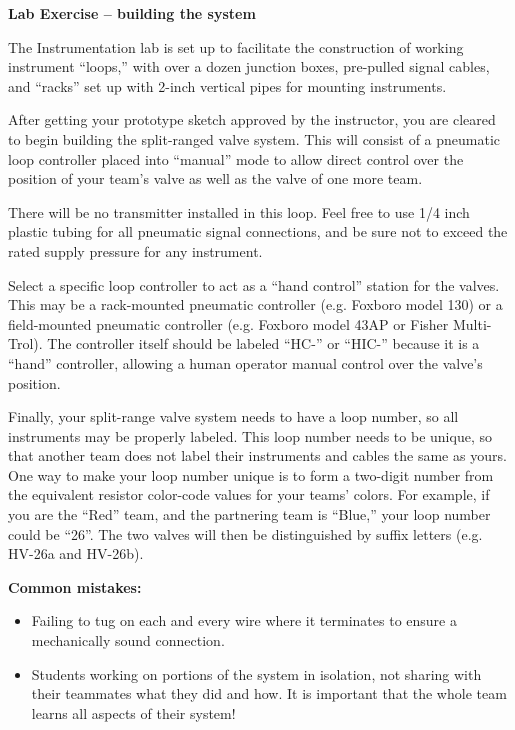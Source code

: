\vfil \eject

\noindent
{\bf Lab Exercise -- building the system}

\vskip 5pt

The Instrumentation lab is set up to facilitate the construction of working instrument ``loops,'' with over a dozen junction boxes, pre-pulled signal cables, and ``racks'' set up with 2-inch vertical pipes for mounting instruments.  

After getting your prototype sketch approved by the instructor, you are cleared to begin building the split-ranged valve system.  This will consist of a pneumatic loop controller placed into ``manual'' mode to allow direct control over the position of your team's valve as well as the valve of one more team.  

There will be no transmitter installed in this loop.  Feel free to use 1/4 inch plastic tubing for all pneumatic signal connections, and be sure not to exceed the rated supply pressure for any instrument.

Select a specific loop controller to act as a ``hand control'' station for the valves.  This may be a rack-mounted pneumatic controller (e.g. Foxboro model 130) or a field-mounted pneumatic controller (e.g. Foxboro model 43AP or Fisher Multi-Trol).  The controller itself should be labeled ``HC-'' or ``HIC-'' because it is a ``hand'' controller, allowing a human operator manual control over the valve's position. 

Finally, your split-range valve system needs to have a loop number, so all instruments may be properly labeled.  This loop number needs to be unique, so that another team does not label their instruments and cables the same as yours.  One way to make your loop number unique is to form a two-digit number from the equivalent resistor color-code values for your teams' colors.  For example, if you are the ``Red'' team, and the partnering team is ``Blue,'' your loop number could be ``26''.  The two valves will then be distinguished by suffix letters (e.g. HV-26a and HV-26b).

\vskip 10pt

{\bf Common mistakes:}

\begin{itemize}
\item{} Failing to tug on each and every wire where it terminates to ensure a mechanically sound connection.
\item{} Students working on portions of the system in isolation, not sharing with their teammates what they did and how.  It is important that the whole team learns all aspects of their system!
\end{itemize}

